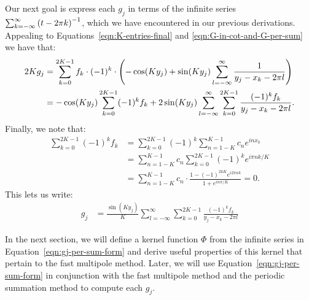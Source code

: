 Our next goal is express each $g_j$ in terms of the infinite series
$\sum_{k=-\infty}^\infty \left(t - 2 \pi k\right)^{-1}$, which we have
encountered in our previous derivations. Appealing to
Equations~\ref{eqn:K-entries-final} and
\ref{eqn:G-in-cot-and-G-per-sum} we have that:
\begin{align*}
  2K g_j &= \sum_{k=0}^{2K-1} f_k \cdot (-1)^k \cdot \left(-\cos(Ky_j) + \sin(Ky_j) \sum_{l=-\infty}^\infty \frac{1}{y_j - x_k - 2\pi l}\right) \notag \\
  &= - \cos(Ky_j) \sum_{k=0}^{2K-1} (-1)^k f_k + 2 \sin(Ky_j) \sum_{l=-\infty}^\infty \sum_{k=0}^{2K-1} \frac{(-1)^k f_k}{y_j - x_k - 2\pi l}. \label{eqn:gj-per-sum-form}
\end{align*}
Finally, we note that:
\begin{align*}
  \sum_{k=0}^{2K-1} (-1)^k f_k
  &= \sum_{k=0}^{2K-1} (-1)^k \sum_{n=1-K}^{K-1} c_n e^{inx_k} \\
  &= \sum_{n=1-K}^{K-1} c_n \sum_{k=0}^{2K-1} (-1)^k e^{i\pi nk/K} \\
  &= \sum_{n=1-K}^{K-1} c_n \cdot \frac{1 - {(-1)}^{2kK} e^{i 2\pi nk}}{1 + e^{i n \pi/ K}} = 0.
\end{align*}
This lets us write:
\begin{align}
  g_j &= \frac{\sin(Ky_j)}{K} \sum_{l=-\infty}^\infty \sum_{k=0}^{2K-1} \frac{(-1)^k f_k}{y_j - x_k - 2\pi l}
\end{align}

In the next section, we will define a kernel function $\Phi$ from the
infinite series in Equation~\ref{eqn:gj-per-sum-form} and derive
useful properties of this kernel that pertain to the fast multipole
method. Later, we will use Equation~\ref{eqn:gj-per-sum-form} in
conjunction with the fast multipole method and the periodic
summation method to compute each $g_j$.

